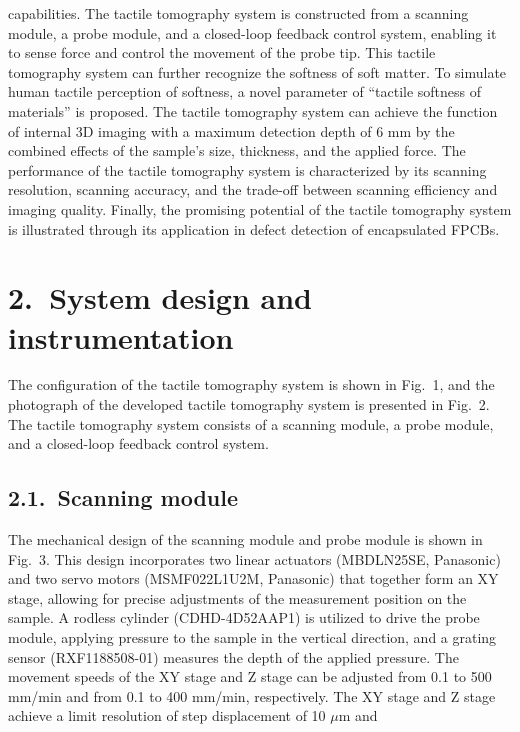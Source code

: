 \documentclass[11pt]{article}
\begin{document}
{capabilities. The tactile tomography system is constructed from a
scanning module, a probe module, and a closed-loop feedback control
system, enabling it to sense force and control the movement of the
probe tip. This tactile tomography system can further recognize the
softness of soft matter. To simulate human tactile perception of
softness, a novel parameter of ``tactile softness of materials'' is
proposed. The tactile tomography system can achieve the function of
internal 3D imaging with a maximum detection depth of 6 mm by the
combined effects of the sample's size, thickness, and the applied
force. The performance of the tactile tomography system is
characterized by its scanning resolution, scanning accuracy, and the
trade-off between scanning efficiency and imaging quality. Finally,
the promising potential of the tactile tomography system is
illustrated through its application in defect detection of
encapsulated FPCBs.}

\section*{2.\ System design and instrumentation}

The configuration of the tactile tomography system is shown in
Fig.~1, and the photograph of the developed tactile tomography
system is presented in Fig.~2. The tactile tomography system
consists of a scanning module, a probe module, and a closed-loop
feedback control system.

\subsection*{2.1.\ Scanning module}

The mechanical design of the scanning module and probe module is
shown in Fig.~3. This design incorporates two linear actuators
(MBDLN25SE, Panasonic) and two servo motors (MSMF022L1U2M, Panasonic)
that together form an XY stage, allowing for precise adjustments of
the measurement position on the sample. A rodless cylinder
(CDHD-4D52AAP1) is utilized to drive the probe module, applying
pressure to the sample in the vertical direction, and a grating
sensor (RXF1188508-01) measures the depth of the applied pressure.
The movement speeds of the XY stage and Z stage can be adjusted
from 0.1 to 500 mm/min and from 0.1 to 400 mm/min, respectively.
The XY stage and Z stage achieve a limit resolution of step
displacement of 10 $\mu$m and
\end{document}
